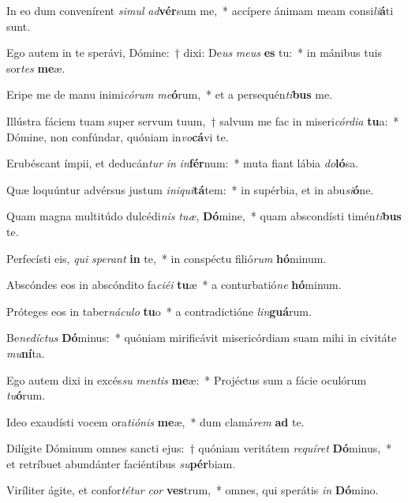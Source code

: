 \item In eo dum convenírent \textit{si}\textit{mul} \textit{ad}\textbf{vér}sum me,~* accípere ánimam meam consi\textit{li}\textbf{á}ti sunt.
\item Ego autem in te sperávi, Dómine:~† dixi: De\textit{us} \textit{me}\textit{us} \textbf{es} tu:~* in mánibus tuis sor\textit{tes} \textbf{me}æ.
\item Eripe me de manu inimi\textit{có}\textit{rum} \textit{me}\textbf{ó}rum,~* et a persequén\textit{ti}\textbf{bus} me.
\item Illústra fáciem tuam super servum tuum,~† salvum me fac in miseri\textit{cór}\textit{di}\textit{a} \textbf{tu}a:~* Dómine, non confúndar, quóniam in\textit{vo}\textbf{cá}vi te.
\item Erubéscant ímpii, et deducán\textit{tur} \textit{in} \textit{in}\textbf{fér}num:~* muta fiant lábia \textit{do}\textbf{ló}sa.
\item Quæ loquúntur advérsus justum \textit{in}\textit{i}\textit{qui}\textbf{tá}tem:~* in supérbia, et in abu\textit{si}\textbf{ó}ne.
\item Quam magna multitúdo dulcédi\textit{nis} \textit{tu}\textit{æ}, \textbf{Dó}mine,~* quam abscondísti timén\textit{ti}\textbf{bus} te.
\item Perfecísti eis, \textit{qui} \textit{spe}\textit{rant} \textbf{in} te,~* in conspéctu filió\textit{rum} \textbf{hó}minum.
\item Abscóndes eos in abscóndito fa\textit{ci}\textit{é}\textit{i} \textbf{tu}æ~* a conturbatió\textit{ne} \textbf{hó}minum.
\item Próteges eos in taber\textit{ná}\textit{cu}\textit{lo} \textbf{tu}o~* a contradictióne \textit{lin}\textbf{guá}rum.
\item Be\textit{ne}\textit{díc}\textit{tus} \textbf{Dó}minus:~* quóniam mirificávit misericórdiam suam mihi in civitáte \textit{mu}\textbf{ní}ta.
\item Ego autem dixi in excés\textit{su} \textit{men}\textit{tis} \textbf{me}æ:~* Projéctus sum a fácie oculórum \textit{tu}\textbf{ó}rum.
\item Ideo exaudísti vocem ora\textit{ti}\textit{ó}\textit{nis} \textbf{me}æ,~* dum clamá\textit{rem} \textbf{ad} te.
\item Dilígite Dóminum omnes sancti ejus:~† quóniam veritátem \textit{re}\textit{quí}\textit{ret} \textbf{Dó}minus,~* et retríbuet abundánter faciéntibus \textit{su}\textbf{pér}biam.
\item Viríliter ágite, et confor\textit{té}\textit{tur} \textit{cor} \textbf{ves}trum,~* omnes, qui sperátis \textit{in} \textbf{Dó}mino.
